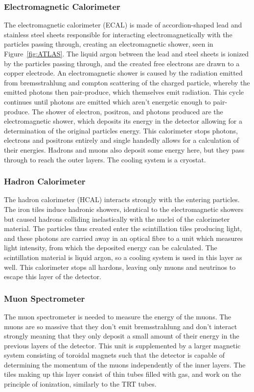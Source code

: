 \documentclass[twocolumn]{article}
\begin{document}
\subsubsection{Electromagnetic Calorimeter}
The electromagnetic calorimeter (ECAL) is made of accordion-shaped lead and stainless steel sheets responsible for interacting electromagnetically with the particles passing through, creating an electromagnetic shower, seen in Figure~\ref{fig:ATLAS}. The liquid argon between the lead and steel sheets is ionized by the particles passing through, and the created free electrons are drawn to a copper electrode. An electromagnetic shower is caused by the radiation emitted from bremsstrahlung and compton scattering of the charged particle, whereby the emitted photons then pair-produce, which themselves emit radiation. This cycle continues until photons are emitted which aren't energetic enough to pair-produce. The shower of electron, positron, and photons produced are the electromagnetic shower, which deposits its energy in the detector allowing for a determination of the original particles energy. This calorimeter stops photons, electrons and positrons entirely and single handedly allows for a calculation of their energies. Hadrons and muons also deposit some energy here, but they pass through to reach the outer layers. The cooling system is a cryostat.

\subsubsection{Hadron Calorimeter}
The hadron calorimeter (HCAL) interacts strongly with the entering particles. The iron tiles induce hadronic showers, identical to the electromagnetic showers but caused hadrons colliding inelastically with the nuclei of the calorimeter material. The particles thus created enter the scintillation tiles producing light, and these photons are carried away in an optical fibre to a unit which measures light intensity, from which the deposited energy can be calculated. The scintillation material is liquid argon, so a cooling system is used in this layer as well. This calorimeter stops all hardons, leaving only muons and neutrinos to escape this layer of the detector.

\subsubsection{Muon Spectrometer}
The muon spectrometer is needed to measure the energy of the muons. The muons are so massive that they don't emit bremsstrahlung and don't interact strongly meaning that they only deposit a small amount of their energy in the previous layers of the detector. This unit is supplemented by a larger magnetic system consisting of toroidal magnets such that the detector is capable of determining the momentum of the muons independently of the inner layers. The tiles making up this layer consist of thin tubes filled with gas, and work on the principle of ionization, similarly to the TRT tubes. 
\end{document}
